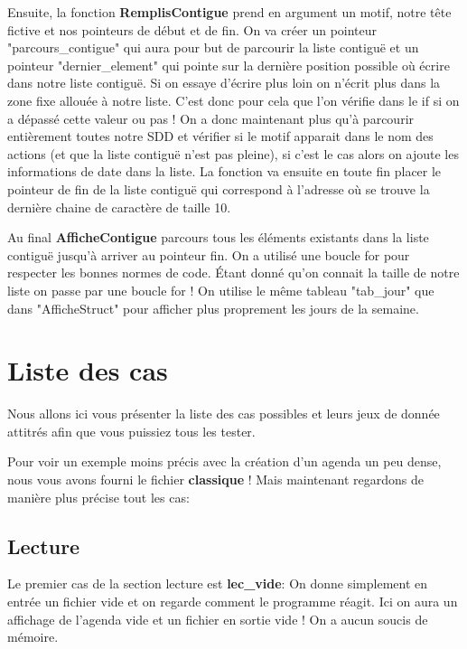 \documentclass[12pt,french]{article} %
\begin{document}
Ensuite, la fonction \textbf{RemplisContigue} prend en argument un motif, notre tête fictive et nos pointeurs de début et de fin. On va créer un pointeur "parcours\_contigue" qui aura pour but de parcourir la liste contiguë et un pointeur "dernier\_element" qui pointe sur la dernière position possible où écrire dans notre liste contiguë. Si on essaye d'écrire plus loin on n'écrit plus dans la zone fixe allouée à notre liste. C'est donc pour cela que l'on vérifie dans le if si on a dépassé cette valeur ou pas ! On a donc maintenant plus qu'à parcourir entièrement toutes notre SDD et vérifier si le motif apparait dans le nom des actions (et que la liste contiguë n'est pas pleine), si c'est le cas alors on ajoute les informations de date dans la liste.
La fonction va ensuite en toute fin placer le pointeur de fin de la liste contiguë qui correspond à l'adresse où se trouve la dernière chaine de caractère de taille 10.\newline

Au final \textbf{AfficheContigue} parcours tous les éléments existants dans la liste contiguë jusqu'à arriver au pointeur fin. On a utilisé une boucle for pour respecter les bonnes normes de code. Étant donné qu'on connait la taille de notre liste on passe par une boucle for ! On utilise le même tableau "tab\_jour" que dans "AfficheStruct" pour afficher plus proprement les jours de la semaine.


\section{Liste des cas}

Nous allons ici vous présenter la liste des cas possibles et leurs jeux de donnée attitrés afin que vous puissiez tous les tester. 

Pour voir un exemple moins précis avec la création d'un agenda un peu dense, nous vous avons fourni le fichier \textbf{classique} ! Mais maintenant regardons de manière plus précise tout les cas:\newline

\subsection{Lecture}

Le premier cas de la section lecture est \textbf{lec\_vide}: On donne simplement en entrée un fichier vide et on regarde comment le programme réagit. Ici on aura un affichage de l'agenda vide et un fichier en sortie vide ! On a aucun soucis de mémoire.\newline
\end{document}
